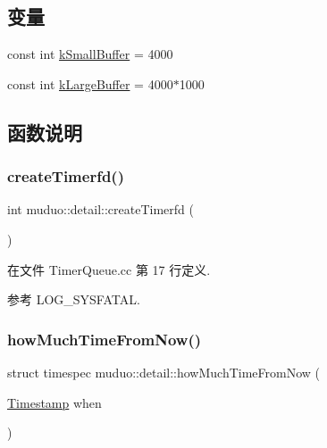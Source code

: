 \subsection*{变量}
\begin{DoxyCompactItemize}
\item 
const int \hyperlink{namespacemuduo_1_1detail_a01441c3dba82e5d4bad1ce2b39ff576b}{k\+Small\+Buffer} = 4000
\item 
const int \hyperlink{namespacemuduo_1_1detail_a72d89caa2e467f089bb6cc480d73b884}{k\+Large\+Buffer} = 4000$\ast$1000
\end{DoxyCompactItemize}


\subsection{函数说明}
\mbox{\label{namespacemuduo_1_1detail_af278c30c3aaaf596fb0d2211bac2ff52}} 
\subsubsection{\texorpdfstring{create\+Timerfd()}{createTimerfd()}}
{\footnotesize\ttfamily int muduo\+::detail\+::create\+Timerfd (\begin{DoxyParamCaption}{ }\end{DoxyParamCaption})}



在文件 Timer\+Queue.\+cc 第 17 行定义.



参考 L\+O\+G\+\_\+\+S\+Y\+S\+F\+A\+T\+AL.

\mbox{\label{namespacemuduo_1_1detail_a14924335d79da967a69c650af3002c77}} 
\subsubsection{\texorpdfstring{how\+Much\+Time\+From\+Now()}{howMuchTimeFromNow()}}
{\footnotesize\ttfamily struct timespec muduo\+::detail\+::how\+Much\+Time\+From\+Now (\begin{DoxyParamCaption}\item[{\hyperlink{classmuduo_1_1Timestamp}{Timestamp}}]{when }\end{DoxyParamCaption})}



